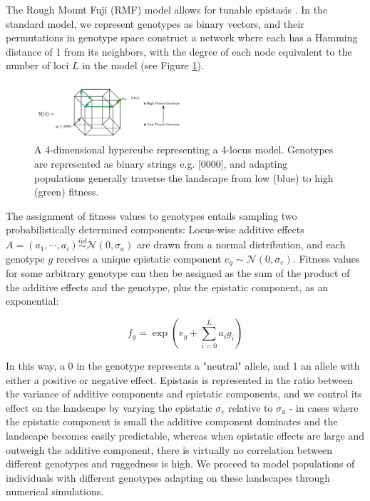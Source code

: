 \documentclass[paper=a4, fontsize=11pt,twoside]{scrartcl}       %
\begin{document}
The Rough Mount Fuji (RMF) model allows for tunable epistasis \cite{neidhartAdaptationTunablyRugged2014}. In the standard model, we represent genotypes as binary vectors, and their permutations in genotype space construct a network where each has a Hamming distance of 1 from its neighbors, with the degree of each node equivalent to the number of loci $L$ in the model (see Figure \ref{genotype_space}). 

\begin{figure}[h!]
	\centering
	\includegraphics[width = 0.5\textwidth]{figures/simple_landscape.png}
	\caption{A 4-dimensional hypercube representing a 4-locus model. Genotypes are represented as binary strings e.g. [0000], and adapting populations generally traverse the landscape from low (blue) to high (green) fitness.}
	\label{genotype_space}
\end{figure}

The assignment of fitness values to genotypes entails sampling two probabilistically determined components: Locus-wise additive effects $A = (a_1, \cdots, a_i) \overset{iid}{\sim} \mathcal{N}(0, \sigma_a)$ are drawn from a normal distribution, and each genotype $g$ receives a unique epistatic component $e_g \sim \mathcal{N}(0, \sigma_e)$.  Fitness values for some arbitrary genotype can then be assigned as the sum of the product of the additive effects and the genotype, plus the epistatic component, as an exponential: 

$$f_g = \exp{\left(e_g + \sum_{i=0}^{L} a_i g_i\right)}$$

In this way, a 0 in the genotype represents a "neutral" allele, and 1 an allele with either a positive or negative effect. Epistasis is represented in the ratio between the variance of additive components and epistatic components, and we control its effect on the landscape by varying the epistatic $\sigma_e$ relative to $\sigma_a$ - in cases where the epistatic component is small the additive component dominates and the landscape becomes easily predictable, whereas when epistatic effects are large and outweigh the additive component, there is virtually no correlation between different genotypes and ruggedness is high. We proceed to model populations of individuals with different genotypes adapting on these landscapes through numerical simulations.
\end{document}
